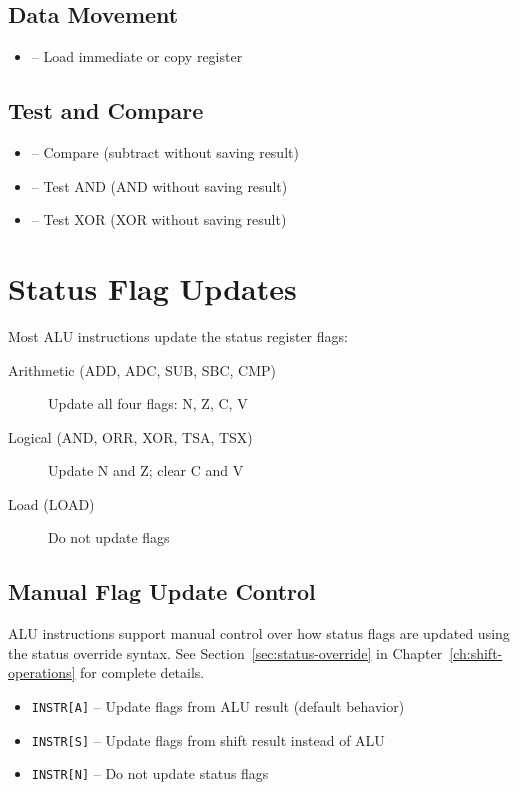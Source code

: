 \subsection{Data Movement}
\begin{itemize}
	\item {} -- Load immediate or copy register
\end{itemize}

\subsection{Test and Compare}
\begin{itemize}
	\item {} -- Compare (subtract without saving result)
	\item {} -- Test AND (AND without saving result)
	\item {} -- Test XOR (XOR without saving result)
\end{itemize}

\section{Status Flag Updates}

Most ALU instructions update the status register flags:

\begin{description}
	\item[Arithmetic (ADD, ADC, SUB, SBC, CMP)] Update all four flags: N, Z, C, V
	\item[Logical (AND, ORR, XOR, TSA, TSX)] Update N and Z; clear C and V
	\item[Load (LOAD)] Do not update flags
\end{description}

\subsection{Manual Flag Update Control}

ALU instructions support manual control over how status flags are updated using the status override syntax. See
Section~\ref{sec:status-override} in Chapter~\ref{ch:shift-operations} for complete details.

\begin{itemize}
	\item \texttt{INSTR[A]} -- Update flags from ALU result (default behavior)
	\item \texttt{INSTR[S]} -- Update flags from shift result instead of ALU
	\item \texttt{INSTR[N]} -- Do not update status flags
\end{itemize}

